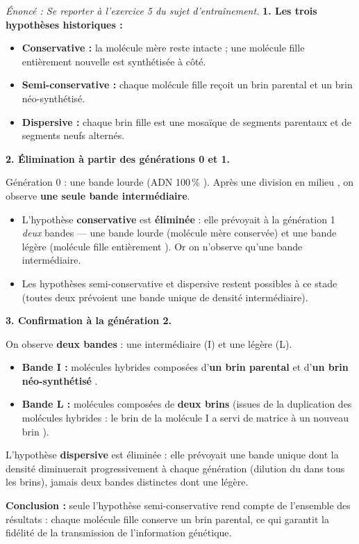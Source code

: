 \documentclass[11pt]{article}
\newcommand{\cle}[1]{{\popxbold\color{popdark}#1}}
\begin{document}
\begin{corrige}
\textit{Énoncé : Se reporter à l'exercice 5 du sujet d'entraînement.}
\tcblower
\textbf{1. Les trois hypothèses historiques :}
\begin{itemize}
    \item \textbf{Conservative :} la molécule mère reste intacte ; une molécule fille entièrement nouvelle est synthétisée à côté.
    \item \textbf{Semi-conservative :} chaque molécule fille reçoit un brin parental et un brin néo-synthétisé.
    \item \textbf{Dispersive :} chaque brin fille est une mosaïque de segments parentaux et de segments neufs alternés.
\end{itemize}

\textbf{2. Élimination à partir des générations 0 et 1.}

Génération 0 : une bande lourde (ADN 100\,\% ). Après une division en milieu , on observe \textbf{une seule bande intermédiaire}.
\begin{itemize}
    \item L'hypothèse \textbf{conservative} est \textbf{éliminée} : elle prévoyait à la génération 1 \emph{deux} bandes — une bande lourde (molécule mère conservée) et une bande légère (molécule fille entièrement ). Or on n'observe qu'une bande intermédiaire.
    \item Les hypothèses semi-conservative et dispersive restent possibles à ce stade (toutes deux prévoient une bande unique de densité intermédiaire).
\end{itemize}

\textbf{3. Confirmation à la génération 2.}

On observe \textbf{deux bandes} : une intermédiaire (I) et une légère (L).
\begin{itemize}
    \item \textbf{Bande I :} molécules hybrides composées d'\textbf{un brin parental } et d'\textbf{un brin néo-synthétisé }.
    \item \textbf{Bande L :} molécules composées de \textbf{deux brins } (issues de la duplication des molécules hybrides : le brin  de la molécule I a servi de matrice à un nouveau brin ).
\end{itemize}
L'hypothèse \textbf{dispersive} est éliminée : elle prévoyait une bande unique dont la densité diminuerait progressivement à chaque génération (dilution du  dans tous les brins), jamais deux bandes distinctes dont une légère.

\textbf{Conclusion :} seule l'hypothèse \cle{semi-conservative} rend compte de l'ensemble des résultats : chaque molécule fille conserve un brin parental, ce qui garantit la fidélité de la transmission de l'information génétique.
\end{corrige}
\end{document}
